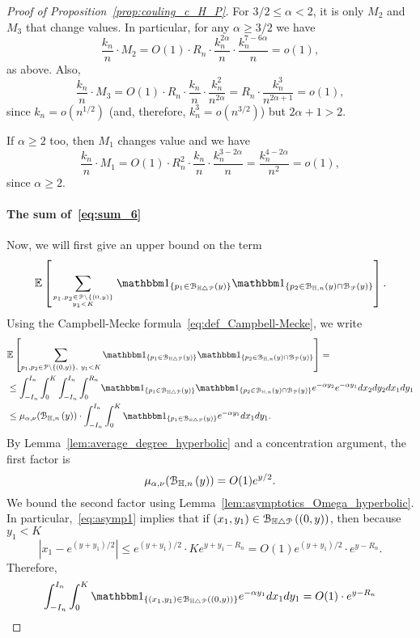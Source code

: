 \begin{proof}[Proof of Proposition~\ref{prop:couling_c_H_P}]
 
For $3/2 \leq \alpha <2$, it is only $M_2$ and $M_3$ that change values. In particular, for any $\alpha \geq 3/2$ we have 
\[
	\frac{k_n}{n} \cdot M_2 =O(1)\cdot R_n \cdot \frac{k_n^{2\alpha}}{n} \cdot 
\frac{k_n^{7-6\alpha}}{n} =o(1),
\]
as above. Also, 
\[
	\frac{k_n}{n} \cdot M_3 = O(1)\cdot
	R_n \cdot \frac{k_n}{n} \cdot \frac{k_n^{2}}{n^{2\alpha}}
	= R_n\cdot  \frac{k_n^{3}}{n^{2\alpha +1}} = o(1),
\]
since $k_n = o(n^{1/2})$ (and, therefore, $k_n^3 = o(n^{3/2})$) but $2\alpha +1 >2$. 

If $\alpha \geq 2$ too, then $M_1$ changes value and we have 
\[
	\frac{k_n}{n} \cdot M_1 =O(1) \cdot R_n^2 \cdot 
\frac{k_n}{n}  \cdot \frac{k_n^{3-2\alpha}}{n} = \frac{k_n^{4 - 2\alpha}}{n^2}= o(1),
\] 
since $\alpha \geq 2$. 



\paragraph{The sum of~\eqref{eq:sum_6}}
Now, we will first give an upper  bound on the term
\begin{equation*}
\Exp { \sum_{p_1,p_2 \in\Pcal \setminus \{(0,y)\} \atop y_1 < K}
\ind{p_1\in \BallSym{y}} \ind{p_2\in \BallHyp{y}\cap \BallPo{y}}}.
\end{equation*}
Using the Campbell-Mecke formula~\eqref{eq:def_Campbell-Mecke}, we write 
\begin{align*}
&\Exp { \sum_{p_1,p_2 \in\Pcal \setminus \{(0,y)\}, \ y_1 < K}
\ind{p_1\in \BallSym{y}} \ind{p_2\in \BallHyp{y}\cap \BallPo{y}}} =\\
&\leq \int_{-I_n}^{I_n} \int_0^K \int_{-I_n}^{I_n} \int_0^{R_n} 
\ind{p_1 \in \BallSym{y}} 
 \ind{p_2 \in \BallHyp{y}\cap \BallPo{y}} e^{-\alpha y_2} e^{-\alpha y_1} 
 dx_2 dy_2 dx_1 dy_1 \\
 &\leq  \mu_{\alpha, \nu} (\BallHyp{y})\cdot
 \int_{-I_n}^{I_n} \int_0^K \ind{p_1 \in \BallSym{y}} 
e^{-\alpha y_1}  dx_1 dy_1.
\end{align*}
By Lemma~\ref{lem:average_degree_hyperbolic} and a concentration argument,  the first factor is 
\[
	\mu_{\alpha, \nu} ({\mathcal B}_{\mathbb{H},n}\left(y\right)) =O(1) e^{y/2}.
\]
We bound the second factor using Lemma~\ref{lem:asymptotics_Omega_hyperbolic}. 
In particular,~\eqref{eq:asymp1} implies that 
if $(x_1,y_1) \in {\mathcal B}_{\mathbb{H} \bigtriangleup {\mathcal P}}\left((0,y)\right)$, then because $y_1 < K$
\[
 |x_1 - e^{(y+y_1)/2} |\leq e^{(y+y_1)/2} \cdot K e^{y+y_1- R_n} = O(1) 
e^{(y+y_1)/2} \cdot e^{y- R_n}.
\]
Therefore, 
\[
	\int_{-I_n}^{I_n} \int_0^K \ind{(x_1,y_1) \in \BallSym{(0,y)}} 
	e^{-\alpha y_1}  dx_1 dy_1 = O(1) \cdot e^{y-R_n} 
\]
\end{proof}
